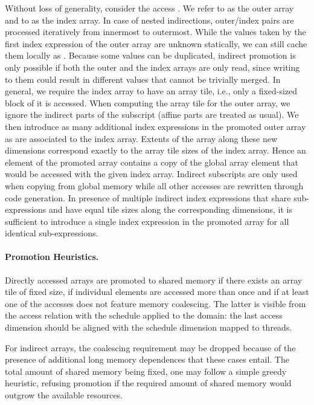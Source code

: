 Without loss of generality, consider the access .
We refer to  as the outer array and to  as the index array.
In case of nested indirections, outer/index pairs are processed iteratively
from innermost to outermost.
While the values taken by the first index expression of the outer array are
unknown statically, we can still cache them locally as
 .
Because some values can be duplicated, indirect promotion is only possible if
both the outer and the index arrays are only read, since writing to them could
result in different values that cannot be trivially merged.
In general, we require the index array to have an array tile, i.e., only a
fixed-sized block of it is accessed.
When computing the array tile for the outer array, we ignore the indirect
parts of the subscript (affine parts are treated as usual).
We then introduce as many additional index expressions in the promoted outer
array as are associated to the index array.
Extents of the array along these new dimensions correspond exactly to the
array tile sizes of the index array.
Hence an element of the promoted array contains a copy of the global array
element that would be accessed with the given index array.
Indirect subscripts are only used when copying from global memory while
all other accesses are rewritten through code generation.
In presence of multiple indirect index expressions that share sub-expressions
and have equal tile sizes along the corresponding dimensions, it is sufficient
to introduce a single index expression in the promoted array for all identical
sub-expressions.

\paragraph{Promotion Heuristics.}
Directly accessed arrays are promoted to shared
memory if there exists an array tile of fixed size, if individual elements are
accessed more than once and if at least one of the accesses does not feature
memory coalescing.
The latter is visible from the access relation with the schedule applied to the
domain: the last access dimension should be aligned with the schedule
dimension mapped to  threads.

For indirect arrays, the coalescing requirement may be dropped because of the
presence of additional long memory dependences that these cases entail.
The total amount of shared memory being fixed, one may follow a simple greedy
heuristic, refusing promotion if the required amount of shared memory would
outgrow the available resources.

